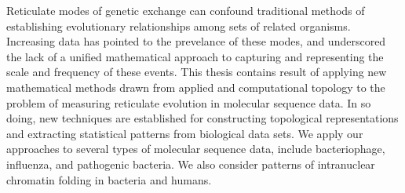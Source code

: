Reticulate modes of genetic exchange can confound traditional methods of establishing evolutionary relationships among sets of related organisms.
Increasing data has pointed to the prevelance of these modes, and underscored the lack of a unified mathematical approach to capturing and representing the scale and frequency of these events.
This thesis contains result of applying new mathematical methods drawn from applied and computational topology to the problem of measuring reticulate evolution in molecular sequence data.
In so doing, new techniques are established for constructing topological representations and extracting statistical patterns from biological data sets.
We apply our approaches to several types of molecular sequence data, include bacteriophage, influenza, and pathogenic bacteria.
We also consider patterns of intranuclear chromatin folding in bacteria and humans.